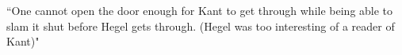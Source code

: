 ``One cannot open the door enough for Kant to get through while being able to slam it shut before Hegel gets through. (Hegel was too interesting of a reader of Kant)"